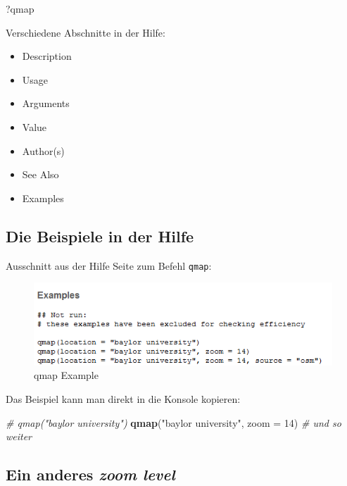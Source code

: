 \documentclass[]{article}
\newenvironment{Shaded}{\begin{snugshade}}{\end{snugshade}}
\newcommand{\KeywordTok}[1]{\textcolor[rgb]{0.13,0.29,0.53}{\textbf{{#1}}}}
\newcommand{\DataTypeTok}[1]{\textcolor[rgb]{0.13,0.29,0.53}{{#1}}}
\newcommand{\DecValTok}[1]{\textcolor[rgb]{0.00,0.00,0.81}{{#1}}}
\newcommand{\StringTok}[1]{\textcolor[rgb]{0.31,0.60,0.02}{{#1}}}
\newcommand{\CommentTok}[1]{\textcolor[rgb]{0.56,0.35,0.01}{\textit{{#1}}}}
\newcommand{\NormalTok}[1]{{#1}}
\providecommand{\tightlist}{%
  \setlength{\itemsep}{0pt}\setlength{\parskip}{0pt}}
\begin{document}
\begin{Shaded}
\begin{Highlighting}[]
\NormalTok{?qmap}
\end{Highlighting}
\end{Shaded}

Verschiedene Abschnitte in der Hilfe:

\begin{itemize}
\tightlist
\item
  Description
\item
  Usage
\item
  Arguments
\item
  Value
\item
  Author(s)
\item
  See Also
\item
  Examples
\end{itemize}

\subsection{Die Beispiele in der
Hilfe}\label{die-beispiele-in-der-hilfe}

Ausschnitt aus der Hilfe Seite zum Befehl \texttt{qmap}:

\begin{figure}[htbp]
\centering
\includegraphics{figure/qmapExample.PNG}
\caption{qmap Example}
\end{figure}

Das Beispiel kann man direkt in die Konsole kopieren:

\begin{Shaded}
\begin{Highlighting}[]
\CommentTok{# qmap("baylor university")}
\KeywordTok{qmap}\NormalTok{(}\StringTok{"baylor university"}\NormalTok{, }\DataTypeTok{zoom =} \DecValTok{14}\NormalTok{)}
\CommentTok{# und so weiter}
\end{Highlighting}
\end{Shaded}

\subsection{\texorpdfstring{Ein anderes \emph{zoom
level}}{Ein anderes zoom level}}\label{ein-anderes-zoom-level-1}
\end{document}
